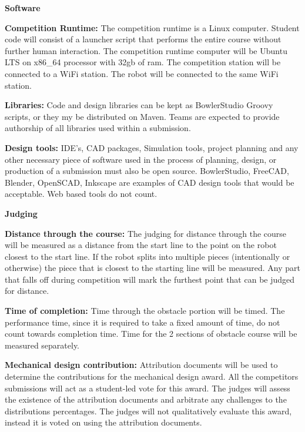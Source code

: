 \documentclass{article}
\begin{document}
 \pagebreak

{\huge \textbf{Software}}

\textbf{Competition Runtime:} The competition runtime is a Linux computer. Student code will consist of a launcher script that performs the entire course without further human interaction. The competition runtime computer will be Ubuntu LTS on x86\_64 processor with 32gb of ram. The competition station will be connected to a WiFi station. The robot will be connected to the same WiFi station.  

\textbf{Libraries:} Code and design libraries can be kept as BowlerStudio Groovy scripts, or they my be distributed on Maven. Teams are expected to provide authorship of all libraries used within a submission. 

\textbf{Design tools:} IDE's, CAD packages, Simulation tools, project planning and any other necessary piece of software used in the process of planning, design, or production of a submission must also be open source. BowlerStudio, FreeCAD, Blender, OpenSCAD, Inkscape are examples of CAD design tools that would be acceptable. Web based tools do not count.  


\vspace{1cm}

 \pagebreak

{\huge \textbf{Judging}}

\textbf{Distance through the course:} The judging for distance through the course will be measured as a distance from the start line to the point on the robot closest to the start line. If the robot splits into multiple pieces (intentionally or otherwise) the piece that is closest to the starting line will be measured. Any part that falls off during competition will mark the furthest point that can be judged for distance.  
 	
\textbf{Time of completion:} Time through the obstacle portion will be timed. The performance time, since it is required to take a fixed amount of time, do not count towards completion time. Time for the 2 sections of obstacle course will be measured separately.  
 	
 \textbf{Mechanical design contribution:} Attribution documents will be used to determine the contributions for the mechanical design award. All the competitors submissions will act as a student-led vote for this award. The judges will assess the existence of the  attribution documents and arbitrate any challenges to the distributions percentages. The judges will not qualitatively evaluate this award, instead it is voted on using the attribution documents. 
 	
\end{document}
